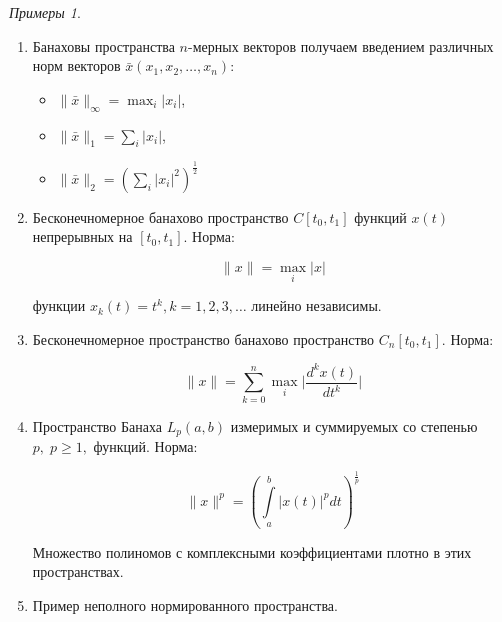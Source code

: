 \documentclass[12pt,a4paper,titlepage, oneside]{book}
\theoremstyle{definition}
\theoremstyle{plain}
\theoremstyle{remark}
\theoremstyle{remark}
\theoremstyle{remark}
\newtheorem*{examples}{Примеры}
\theoremstyle{remark}
\theoremstyle{plain}
\theoremstyle{plain}
\begin{document}
\begin{examples}
\leavevmode
\begin{enumerate}

	\item Банаховы пространства $n$-мерных векторов получаем введением различных норм векторов $\bar{x}(x_1,x_2,\ldots,x_n)$:

	\begin{itemize}

		\item $\lVert \bar{x}\rVert_\infty=\displaystyle\max_{i}\lvert x_i\rvert$,

		\item $\lVert \bar{x}\rVert_1 = \displaystyle\sum_{i}\lvert x_i\rvert$,

		\item $\lVert \bar{x}\rVert_2 = (\displaystyle\sum_{i}\lvert x_i\rvert^2)^{\frac{1}{2}}$

	\end{itemize}

	\item Бесконечномерное банахово пространство $C[t_0,t_1]$ функций $x(t)$ непрерывных на $[t_0,t_1]$. Норма:

	\begin{equation*}
	\lVert x\rVert = \displaystyle\max_{i}\lvert x\rvert
	\end{equation*}

	функции $x_k(t)=t^k, k=1,2,3,\ldots$ линейно независимы.

	\item Бесконечномерное пространство банахово пространство $C_n[t_0,t_1]$. Норма:

	\begin{equation*}
	\lVert x\rVert = \displaystyle\sum_{k=0}^n\max_{i}\lvert\frac{d^kx(t)}{dt^k}\rvert
	\end{equation*}

	\item Пространство Банаха $L_p(a,b)$ измеримых и суммируемых со степенью $p,\;p\geq1,$ функций. Норма:

	\begin{equation*}
	\lVert x\rVert^p = (\int\limits_a^b\lvert x(t)\rvert^pdt)^{\frac{1}{p}}
	\end{equation*}

	Множество полиномов с комплексными коэффициентами плотно в этих пространствах.

	\item Пример неполного нормированного пространства.


\end{enumerate}
\end{examples}
\end{document}

